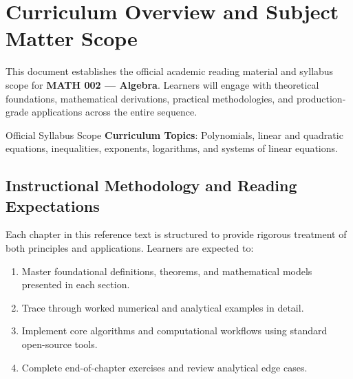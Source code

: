 \section{Curriculum Overview and Subject Matter Scope}

This document establishes the official academic reading material and syllabus scope for \textbf{MATH 002 --- Algebra}. Learners will engage with theoretical foundations, mathematical derivations, practical methodologies, and production-grade applications across the entire sequence.

\begin{InsightBox}{Official Syllabus Scope}
  \textbf{Curriculum Topics}: Polynomials, linear and quadratic equations, inequalities, exponents, logarithms, and systems of linear equations.
\end{InsightBox}

\subsection{Instructional Methodology and Reading Expectations}

Each chapter in this reference text is structured to provide rigorous treatment of both principles and applications. Learners are expected to:
\begin{enumerate}
  \item Master foundational definitions, theorems, and mathematical models presented in each section.
  \item Trace through worked numerical and analytical examples in detail.
  \item Implement core algorithms and computational workflows using standard open-source tools.
  \item Complete end-of-chapter exercises and review analytical edge cases.
\end{enumerate}

